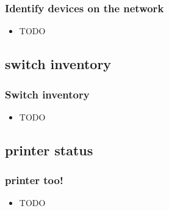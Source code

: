 \documentclass{beamer}
\begin{document}
\begin{frame}
\frametitle{Identify devices on the network}
%
\begin{itemize}
%
\item TODO
%
\end{itemize}
\end{frame}
\subsection{switch inventory}

\begin{frame}
\frametitle{Switch inventory}

\begin{itemize}
%
\item TODO
%
\end{itemize}
\end{frame}
\subsection{printer status}


\begin{frame}
\frametitle{printer too!}

\begin{itemize}

\item TODO

\end{itemize}
\end{frame}
\end{document}
